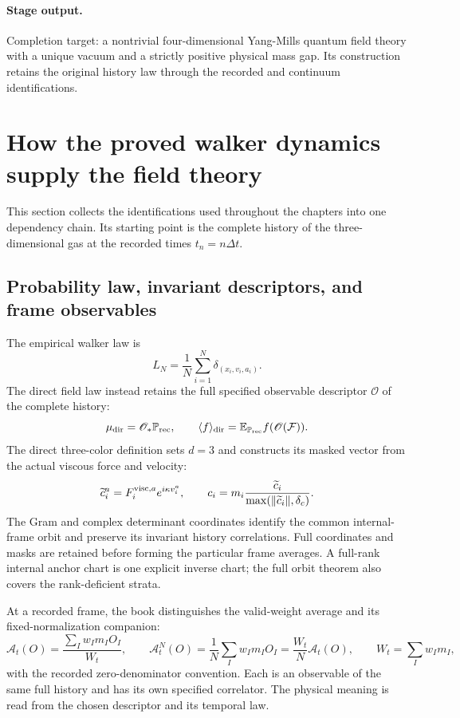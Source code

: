 \documentclass[11pt,a4paper]{article}
\begin{document}
\paragraph{Stage output.} Completion target: a nontrivial four-dimensional Yang-Mills quantum field theory with a unique vacuum and a strictly positive physical mass gap. Its construction retains the original history law through the recorded and continuum identifications.

\clearpage
\section{How the proved walker dynamics supply the field theory}
This section collects the identifications used throughout the chapters into one dependency chain. Its starting point is the complete history of the three-dimensional gas at the recorded times \(t_n=n\Delta t\).

\subsection{Probability law, invariant descriptors, and frame observables}
The empirical walker law is
\[
L_N=\frac1N\sum_{i=1}^N\delta_{(x_i,v_i,a_i)}.
\]
The direct field law instead retains the full specified observable descriptor \(\mathscr O\) of the complete history:
\[
\mu_{\rm dir}=\mathscr O_*\mathbb P_{\rm rec},\qquad
\langle f\rangle_{\rm dir}
=\mathbb E_{\mathbb P_{\rm rec}}f(\mathscr O(\mathcal F)).
\]
The direct three-color definition sets \(d=3\) and constructs its masked vector from the actual viscous force and velocity:
\[
\widetilde c_i^a=F_i^{{\rm visc},a}e^{i\kappa v_i^a},\qquad
c_i=m_i\frac{\widetilde c_i}{\max(\|\widetilde c_i\|,\delta_c)}.
\]
The Gram and complex determinant coordinates identify the common internal-frame orbit and preserve its invariant history correlations. Full coordinates and masks are retained before forming the particular frame averages. A full-rank internal anchor chart is one explicit inverse chart; the full orbit theorem also covers the rank-deficient strata.

At a recorded frame, the book distinguishes the valid-weight average and its fixed-normalization companion:
\[
\mathcal A_t(O)=\frac{\sum_Iw_Im_IO_I}{W_t},\qquad
\mathcal A_t^N(O)=\frac1N\sum_Iw_Im_IO_I
=\frac{W_t}{N}\mathcal A_t(O),\qquad W_t=\sum_Iw_Im_I,
\]
with the recorded zero-denominator convention. Each is an observable of the same full history and has its own specified correlator. The physical meaning is read from the chosen descriptor and its temporal law.
\end{document}
